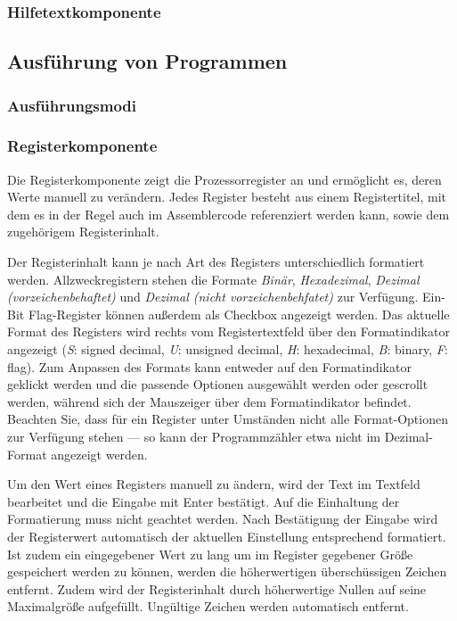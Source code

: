 \subsubsection{Hilfetextkomponente}
\label{help-component}


\subsection{Ausführung von Programmen}

\subsubsection{Ausführungsmodi}

\subsubsection{Registerkomponente}
Die Registerkomponente zeigt die Prozessorregister an und ermöglicht es, deren Werte manuell zu verändern. Jedes Register besteht aus einem Registertitel, mit dem es in der Regel auch im Assemblercode referenziert werden kann, sowie dem zugehörigem Registerinhalt.

Der Registerinhalt kann je nach Art des Registers unterschiedlich formatiert werden. Allzweckregistern stehen die Formate \textit{Binär}, \textit{Hexadezimal}, \textit{Dezimal (vorzeichenbehaftet)} und \textit{Dezimal (nicht vorzeichenbehfatet)} zur Verfügung. Ein-Bit Flag-Register können außerdem als Checkbox angezeigt werden.
Das aktuelle Format des Registers wird rechts vom Registertextfeld über den Formatindikator angezeigt (\textit{S}: signed decimal, \textit{U}: unsigned decimal, \textit{H}: hexadecimal, \textit{B}: binary, \textit{F}: flag). Zum Anpassen des Formats kann entweder auf den Formatindikator geklickt werden und die passende Optionen ausgewählt werden oder gescrollt werden, während sich der Mauszeiger über dem Formatindikator befindet. Beachten Sie, dass für ein Register unter Umständen nicht alle Format-Optionen zur Verfügung stehen --- so kann der Programmzähler etwa nicht im Dezimal-Format angezeigt werden.

Um den Wert eines Registers manuell zu ändern, wird der Text im Textfeld bearbeitet und die Eingabe mit Enter bestätigt. Auf die Einhaltung der Formatierung muss nicht geachtet werden. Nach Bestätigung der Eingabe wird der Registerwert automatisch der aktuellen Einstellung entsprechend formatiert. Ist zudem ein eingegebener Wert zu lang um im Register gegebener Größe gespeichert werden zu können, werden die höherwertigen überschüssigen Zeichen entfernt. Zudem wird der Registerinhalt durch höherwertige Nullen auf seine Maximalgröße aufgefüllt. Ungültige Zeichen werden automatisch entfernt.

